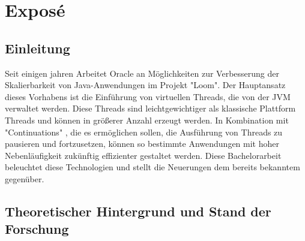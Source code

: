 \chapter{Exposé}

\section{Einleitung}


Seit einigen jahren Arbeitet Oracle an Möglichkeiten zur Verbesserung der Skalierbarkeit von Java-Anwendungen im Projekt "Loom".
Der Hauptansatz dieses Vorhabens ist die Einführung von virtuellen Threads, die von der JVM verwaltet werden. 
Diese Threads sind leichtgewichtiger als klassische Plattform Threads und können in größerer Anzahl erzeugt werden. 
In Kombination mit "Continuations" \cite{Continuations}, die es ermöglichen sollen, die Ausführung von Threads zu pausieren und fortzusetzen,
können so bestimmte Anwendungen mit hoher Nebenläufigkeit zukünftig effizienter gestaltet werden. Diese Bachelorarbeit 
beleuchtet diese Technologien und stellt die Neuerungen dem bereits bekanntem gegenüber.





\section{Theoretischer Hintergrund und Stand der Forschung}
\label{sec:hintergrund}


